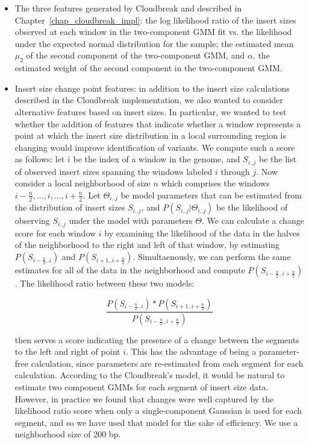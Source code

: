 \begin{itemize}

\item The three features generated by Cloudbreak and described in Chapter~\ref{chap_cloudbreak_impl}: the log likelihood ratio of the insert sizes observed at each window in the two-component GMM fit vs. the likelihood under the expected normal distribution for the sample; the estimated mean $\mu_2$ of the second component of the two-component GMM, and $\alpha$, the estimated weight of the second component in the two-component GMM.

\item Insert size change point features: in addition to the insert size calculations described in the Cloudbreak implementation, we also wanted to consider alternative features based on insert sizes. In particular, we wanted to test whether the addition of features that indicate whether a window represents a point at which the insert size distribution in a local surrounding region is changing would improve identification of variants. We compute such a score as follows: let $i$ be the index of a window in the genome, and $S_{i..j}$ be the list of observed insert sizes spanning the windows labeled $i$ through $j$. Now consider a local neighborhood of size $n$ which comprises the windows $i-\frac{n}{2},...,i,...,i+\frac{n}{2}$. Let $\Theta_{i..j}$ be model parameters that can be estimated from the distribution of insert sizes $S_{i..j}$, and $P(S_{i..j}|\Theta_{i..j})$ be the likelihood of observing $S_{i..j}$ under the model with parameters $\Theta$. We can calculate a change score for each window $i$ by examining the likelihood of the data in the halves of the neighborhood to the right and left of that window, by estimating $P(S_{i-\frac{n}{2}..i})$ and $P(S_{i+1..i+\frac{n}{2}})$. Simultaenously, we can perform the same estimates for all of the data in the neighborhood and compute $P(S_{i-\frac{n}{2}..i+\frac{n}{2}})$. The likelihood ratio between these two models:

\[ \frac{P(S_{i-\frac{n}{2}..i}) * P(S_{i+1..i+\frac{n}{2}})}{ P(S_{i-\frac{n}{2}..i+\frac{n}{2}})} \]

then serves a score indicating the presence of a change between the segments to the left and right of point $i$. This has the advantage of being a parameter-free calculation, since parameters are re-estimated from each segment for each calculation. According to the Cloudbreak's model, it would be natural to estimate two component GMMs for each segment of insert size data. However, in practice we found that changes were well captured by the likelihood ratio score when only a single-component Gaussian is used for each segment, and so we have used that model for the sake of efficiency. We use a neighborhood size of 200 bp.

\end{itemize}

